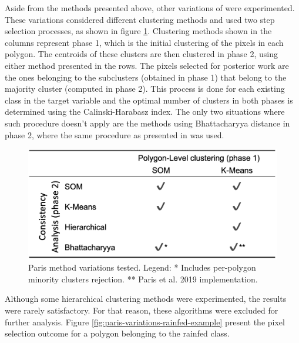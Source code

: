 \documentclass[12pt, english, openany]{book}
\begin{document}
Aside from the methods presented above, other variations of
\cite{Paris2019} were experimented. These variations considered
different clustering methods and used two step selection processes, as shown in
figure \ref{fig:paris-variations}. Clustering methods shown in the columns
represent phase 1, which is the initial clustering of the pixels in each
polygon. The centroids of these clusters are then clustered in phase 2, using
either method presented in the rows. The pixels selected for posterior work are
the ones belonging to the subclusters (obtained in phase 1) that belong to the
majority cluster (computed in phase 2). This process is done for each existing
class in the target variable and the optimal number of clusters in both phases
is determined using the Calinski-Harabasz index. The only two situations where
such procedure doesn't apply are the methods using Bhattacharyya distance in
phase 2, where the same procedure as presented in \cite{Paris2019} was
used.

\begin{figure}[H]
  \centering
  \includegraphics[width=.7\linewidth]{paris_variations.png}
  \caption[Paris method variations tested.]{Paris method variations tested. Legend: * Includes per-polygon minority
    clusters rejection. ** Paris et al. 2019 implementation.}
  \label{fig:paris-variations}
\end{figure}

Although some hierarchical clustering methods were experimented, the results
were rarely satisfactory. For that reason, these algorithms were excluded for
further analysis. Figure \ref{fig:paris-variations-rainfed-example} present the pixel selection
outcome for a polygon belonging to the rainfed class.
\end{document}
